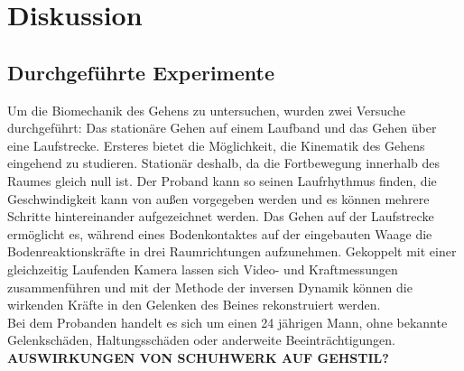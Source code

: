 \section{Diskussion}
\subsection{Durchgeführte Experimente}
Um die Biomechanik des Gehens zu untersuchen, wurden zwei Versuche durchgeführt: Das stationäre Gehen auf einem Laufband und das Gehen über eine Laufstrecke. Ersteres bietet die Möglichkeit, die Kinematik des Gehens eingehend zu studieren. Stationär deshalb, da die Fortbewegung innerhalb des Raumes gleich null ist. Der Proband kann so seinen Laufrhythmus finden, die Geschwindigkeit kann von außen vorgegeben werden und es können mehrere Schritte hintereinander aufgezeichnet werden. Das Gehen auf der Laufstrecke ermöglicht es, während eines Bodenkontaktes auf der eingebauten Waage die Bodenreaktionskräfte in drei Raumrichtungen aufzunehmen. Gekoppelt mit einer gleichzeitig Laufenden Kamera lassen sich Video- und Kraftmessungen zusammenführen und mit der Methode der inversen Dynamik können die wirkenden Kräfte in den Gelenken des Beines rekonstruiert werden. \\
Bei dem Probanden handelt es sich um einen 24 jährigen Mann, ohne bekannte Gelenkschäden, Haltungsschäden oder anderweite Beeinträchtigungen. 
\textbf{AUSWIRKUNGEN VON SCHUHWERK AUF GEHSTIL?}


